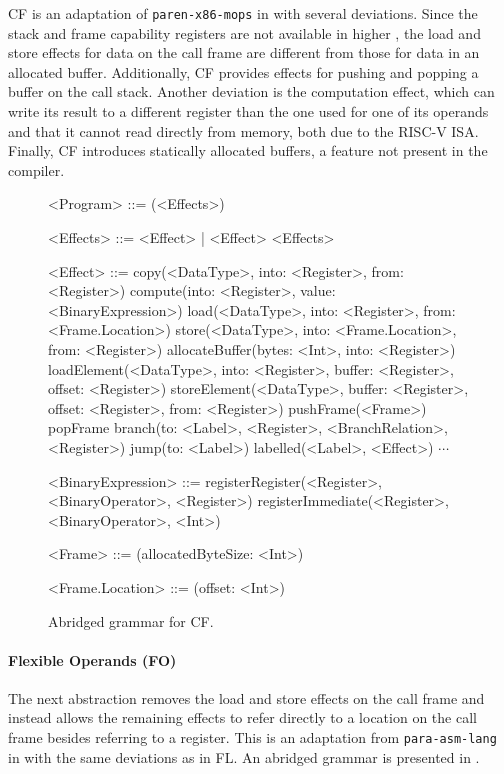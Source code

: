 \documentclass[main.tex]{subfiles}
\begin{document}
CF is an adaptation of \texttt{paren-x86-mops} in \cite{compcourse} with several deviations. Since the stack and frame capability registers are not available in higher \ils{}, the load and store effects for data on the call frame are different from those for data in an allocated buffer. Additionally, CF provides effects for pushing and popping a buffer on the call stack. Another deviation is the computation effect, which can write its result to a different register than the one used for one of its operands and that it cannot read directly from memory, both due to the RISC-V ISA. Finally, CF introduces statically allocated buffers, a feature not present in the \cite{compcourse} compiler.

\begin{figure}[ht]
	\begin{grammar}
		
		<Program> ::= (<Effects>)
		
		<Effects> ::= <Effect> | <Effect> <Effects>
		
		<Effect> ::= copy(<DataType>, into: <Register>, from: <Register>)
			\alt compute(into: <Register>, value: <BinaryExpression>)
			\alt load(<DataType>, into: <Register>, from: <Frame.Location>)
			\alt store(<DataType>, into: <Frame.Location>, from: <Register>)
			\alt allocateBuffer(bytes: <Int>, into: <Register>)
			\alt loadElement(<DataType>, into: <Register>, buffer: <Register>, offset: <Register>)
			\alt storeElement(<DataType>, buffer: <Register>, offset: <Register>, from: <Register>)
			\alt pushFrame(<Frame>)
			\alt popFrame
			\alt branch(to: <Label>, <Register>, <BranchRelation>, <Register>)
			\alt jump(to: <Label>)
			\alt labelled(<Label>, <Effect>)
			\alt $\cdots$
		
		<BinaryExpression> ::= registerRegister(<Register>, <BinaryOperator>, <Register>)
			\alt registerImmediate(<Register>, <BinaryOperator>, <Int>)
		
		<Frame> ::= (allocatedByteSize: <Int>)
		
		<Frame.Location> ::= (offset: <Int>)
		
	\end{grammar}
	\caption{Abridged grammar for CF.}
	\label{bnf:cf}
\end{figure}

\paragraph{Flexible Operands (FO)} The next abstraction removes the load and store effects on the call frame and instead allows the remaining effects to refer directly to a location on the call frame besides referring to a register. This is an adaptation from \texttt{para-asm-lang} in \cite{compcourse} with the same deviations as in FL. An abridged grammar is presented in .
\end{document}
